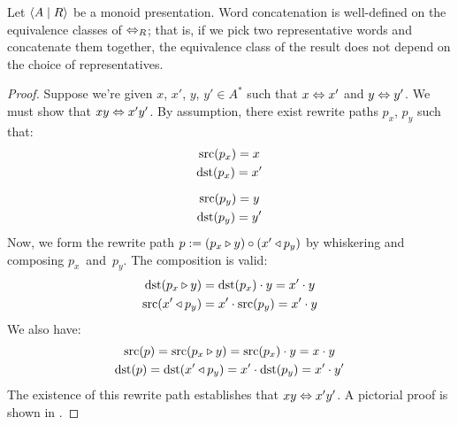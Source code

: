 \documentclass[../generics]{subfiles}
\begin{document}
\begin{theorem}
Let $\langle A \mid R\rangle$ be a monoid presentation. Word concatenation is well-defined on the equivalence classes of $\Leftrightarrow_R$; that is, if we pick two representative words and concatenate them together, the equivalence class of the result does not depend on the choice of representatives.
\end{theorem}
\begin{proof}
Suppose we're given $x$, $x'$, $y$, $y'\in A^*$ such that $x\Leftrightarrow x'$ and $y\Leftrightarrow y'$. We must show that $xy\Leftrightarrow x' y'$. By assumption, there exist rewrite paths $p_x$, $p_y$ such that:
\begin{gather*}
\operatorname{src}(p_x)=x\\
\operatorname{dst}(p_x)=x'\\[\medskipamount]
\operatorname{src}(p_y)=y\\
\operatorname{dst}(p_y)=y'
\end{gather*}
Now, we form the rewrite path $p := (p_x\triangleright y) \circ (x'\triangleleft p_y)$ by whiskering and composing $p_x$~and~$p_y$. The composition is valid:
\begin{gather*}
\operatorname{dst}(p_x\triangleright y)=\operatorname{dst}(p_x)\cdot y=x'\cdot y\\
\operatorname{src}(x'\triangleleft p_y)=x'\cdot\operatorname{src}(p_y)=x'\cdot y
\end{gather*}
We also have:
\begin{gather*}
\operatorname{src}(p) = \operatorname{src}(p_x\triangleright y) = \operatorname{src}(p_x)\cdot y = x\cdot y\\
\operatorname{dst}(p) = \operatorname{dst}(x'\triangleleft p_y) = x' \cdot \operatorname{dst}(p_y) = x'\cdot y'
\end{gather*}
The existence of this rewrite path establishes that $xy\Leftrightarrow x' y'$. A pictorial proof is shown in .
\end{proof}
\end{document}

